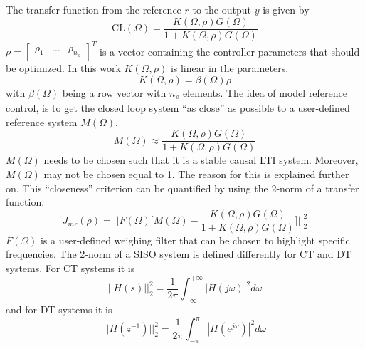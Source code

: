 The transfer function from the reference $r$ to the output $y$ is given by
\begin{equation*}
    \text{CL}(\Omega) = \frac{K(\Omega,\rho) G(\Omega)}{1 + K(\Omega,\rho) G(\Omega)}
\end{equation*}
$\rho = \begin{bmatrix}
        \rho_1 & \ldots & \rho_{n_{\rho}}
\end{bmatrix}^T$ is a vector containing the controller parameters that should be optimized. In this work $K(\Omega,\rho)$ is linear in the parameters.
\begin{equation}
    K(\Omega,\rho) = \beta(\Omega) \rho
    \label{eq:linear_in_the_parameters}
\end{equation}
with $\beta(\Omega)$ being a row vector with $n_\rho$ elements.
The idea of model reference control, is to get the closed loop system ``as close'' as possible to a user-defined reference system $M(\Omega)$.
\begin{equation*}
    M(\Omega) \approx \frac{K(\Omega,\rho) G(\Omega)}{1 + K(\Omega,\rho) G(\Omega)}
\end{equation*}
$M(\Omega)$ needs to be chosen such that it is a stable causal LTI system. Moreover, $M(\Omega)$ may not be chosen equal to 1. The reason for this is explained further on. This ``closeness'' criterion can be quantified by using the 2-norm of a transfer function.
\begin{equation}
    J_{mr}(\rho) =  \Big|\Big|F(\Omega) \Big[M(\Omega)-\frac{K(\Omega,\rho) G(\Omega)}{1 + K(\Omega,\rho) G(\Omega)}\Big]  \Big|\Big|_2^2 
    \label{eq:Jmr}
\end{equation}
$F(\Omega)$ is a user-defined weighing filter that can be chosen to highlight specific frequencies. The 2-norm of a SISO system is defined differently for CT and DT systems. For CT systems it is
\begin{equation*}
    ||H(s)||_2^2 = \frac{1}{2\pi} \int_{-\infty}^{+\infty} |H(j\omega)|^2 d\omega
\end{equation*}
and for DT systems it is
\begin{equation*}
    ||H(z^{-1})||_2^2 = \frac{1}{2\pi} \int_{-\pi}^{\pi} |H(e^{j\omega})|^2 d\omega
\end{equation*}

